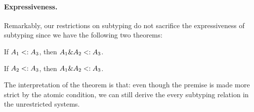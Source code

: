 \paragraph{Expressiveness.}
Remarkably, our restrictions on subtyping do not sacrifice the expressiveness of
subtyping since we have the following two theorems:
\begin{theorem}
  If $A_1 <: A_3$, then $A_1 \& A_2 <: A_3$.
\end{theorem}
\begin{theorem}
If $A_2 <: A_3$, then $A_1 \& A_2 <: A_3$.
\end{theorem}

The interpretation of the theorem is that: even though the premise is made more
strict by the atomic condition, we can still derive the every subtyping relation
in the unrestricted systems.

\begin{comment}
Note that $A$ \emph{exclusive} or $B$ is true if and only if their truth value
differ. Next, we are going to investigate the minimal requirement (necessary and
sufficient conditions) such that the theorem holds.

If $A_1$ and $A_2$ in this setting are the same, for example,
$\tyint \inter \tyint \subtype \tyint$, obviously the theorem will
not hold since both the left $\tyint$ and the right $\tyint$ are a
subtype of $\tyint$.

We can try to rule out such possibilities by making the requirement of
well-formedness stronger. This suggests that the two types on the sides of
$\inter$ should not ``overlap''. In other words, they should be ``disjoint''. It
is easy to determine if two base types are disjoint. For example, $\tyint$
and $\tyint$ are not disjoint. Neither do $\tyint$ and $\code{Nat}$.
Also, types built with different constructors are disjoint. For example,
$\tyint$ and $\tyint \to \tyint$. For function types, disjointness
is harder to visualise. But bear in the mind that disjointness can defined by
the very requirement that the theorem holds.


This result is captured more formally by the following lemma:
\end{comment}




